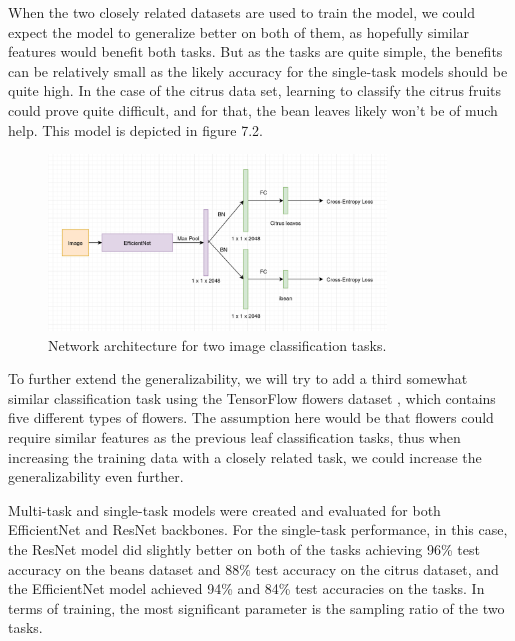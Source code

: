 When the two closely related datasets are used to train the model, we could expect the model to generalize better on both of them, as hopefully similar features would benefit both tasks.
But as the tasks are quite simple, the benefits can be relatively small as the likely accuracy for the single-task models should be quite high.
In the case of the citrus data set, learning to classify the citrus fruits could prove quite difficult, and for that, the bean leaves likely won't be of much help.
This model is depicted in figure 7.2.

\begin{figure}[h!] 
\centering 
\includegraphics[width=0.8\textwidth]{imgs/object_classification_architecture.png}
\caption{Network architecture for two image classification tasks.}
\end{figure}

To further extend the generalizability, we will try to add a third somewhat similar classification task using the TensorFlow flowers dataset \citep{tfflowers}, which contains five different types of flowers. 
The assumption here would be that flowers could require similar features as the previous leaf classification tasks, thus when increasing the training data with a closely related task, we could increase the generalizability even further.

Multi-task and single-task models were created and evaluated for both EfficientNet and ResNet backbones.
For the single-task performance, in this case, the ResNet model did slightly better on both of the tasks achieving 96\% test accuracy on the beans dataset and 88\% test accuracy on the citrus dataset, and the EfficientNet model achieved 94\% and 84\% test accuracies on the tasks.
In terms of training, the most significant parameter is the sampling ratio of the two tasks.

